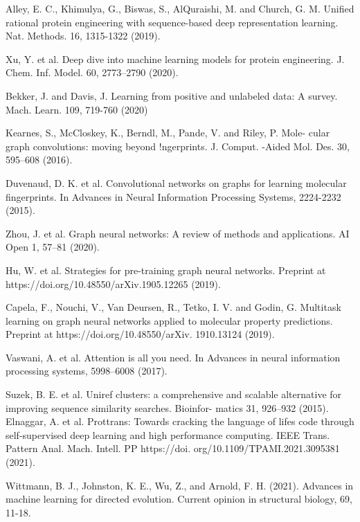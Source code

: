 \documentclass[12pt]{article}
\begin{document}
\begin{thebibliography}{99}
 Alley, E. C., Khimulya, G., Biswas, S., AlQuraishi, M. and Church, G. M. Unified rational protein engineering with sequence-based deep representation learning. Nat. Methods. 16, 1315-1322 (2019).

 Xu, Y. et al. Deep dive into machine learning models for protein engineering. J. Chem. Inf. Model. 60, 2773–2790 (2020).

 Bekker, J. and Davis, J. Learning from positive and unlabeled data: A survey. Mach. Learn. 109, 719-760 (2020)


 Kearnes, S., McCloskey, K., Berndl, M., Pande, V. and  Riley, P. Mole- cular graph convolutions: moving beyond !ngerprints. J. Comput. -Aided Mol. Des. 30, 595–608 (2016).

 Duvenaud, D. K. et al. Convolutional networks on graphs for learning molecular fingerprints. In Advances in Neural Information Processing Systems, 2224-2232 (2015).

 Zhou, J. et al. Graph neural networks: A review of methods and applications. AI Open 1, 57–81 (2020).

 Hu, W. et al. Strategies for pre-training graph neural networks. Preprint at https://doi.org/10.48550/arXiv.1905.12265 (2019). 



 Capela, F., Nouchi, V., Van Deursen, R., Tetko, I. V. and  Godin, G. Multitask learning on graph neural networks applied to molecular property predictions. Preprint at https://doi.org/10.48550/arXiv. 1910.13124 (2019).

  Vaswani, A. et al. Attention is all you need. In Advances in neural information processing systems, 5998–6008 (2017).

 Suzek, B. E. et al. Uniref clusters: a comprehensive and scalable alternative for improving sequence similarity searches. Bioinfor- matics 31, 926–932 (2015).
 Elnaggar, A. et al. Prottrans: Towards cracking the language of lifes code through self-supervised deep learning and high performance computing. IEEE Trans. Pattern Anal. Mach. Intell. PP https://doi. org/10.1109/TPAMI.2021.3095381 (2021).


 Wittmann, B. J., Johnston, K. E., Wu, Z., and  Arnold, F. H. (2021). Advances in machine learning for directed evolution. Current opinion in structural biology, 69, 11-18.

\end{thebibliography}
\end{document}
